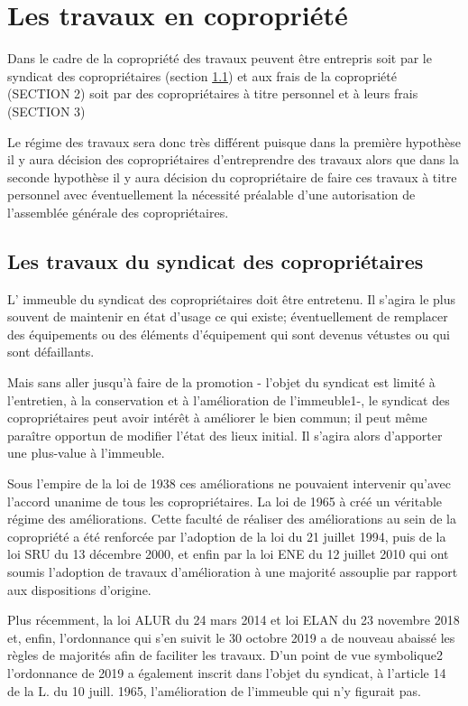 \chapter{Les travaux en copropriété}

Dans le cadre de la copropriété des travaux peuvent être entrepris soit par le syndicat des copropriétaires (section \ref{21_I}) et aux frais de la copropriété (SECTION 2) soit par des copropriétaires à titre personnel et à leurs frais (SECTION 3)

Le régime des travaux sera donc très différent puisque dans la première hypothèse il y aura décision des copropriétaires d'entreprendre des travaux alors que dans la seconde hypothèse il y aura décision du copropriétaire de faire ces travaux à titre personnel avec éventuellement la nécessité préalable d’une autorisation de l'assemblée générale des copropriétaires.

\section{Les travaux du syndicat des copropriétaires}\label{21_I}
	
	L' immeuble du syndicat des copropriétaires doit être entretenu. Il s'agira le plus souvent de maintenir en état d’usage ce qui existe; éventuellement de remplacer des équipements ou des éléments d’équipement qui sont devenus vétustes ou qui sont défaillants.
	
	Mais sans aller jusqu’à faire de la promotion - l’objet du syndicat est limité à l'entretien, à la conservation et à l’amélioration de l'immeuble1-, le syndicat des copropriétaires peut avoir intérêt à améliorer le bien commun; il peut même paraître opportun de modifier l'état des lieux initial. Il s'agira alors d'apporter une plus-value à l’immeuble.
	
	Sous l'empire de la loi de 1938 ces améliorations ne pouvaient intervenir qu'avec l'accord unanime de tous les copropriétaires. La loi de 1965 à créé un véritable régime des améliorations. Cette faculté de réaliser des améliorations au sein de la copropriété a été renforcée par l'adoption de la loi du 21 juillet 1994, puis de la loi SRU du 13 décembre 2000, et enfin par la loi ENE du 12 juillet 2010 qui ont soumis l'adoption de travaux d'amélioration à une majorité assouplie par rapport aux dispositions d'origine.
	
	Plus récemment, la loi ALUR du 24 mars 2014 et loi ELAN du 23 novembre 2018 et, enfin, l’ordonnance qui s’en suivit le 30 octobre 2019 a de nouveau abaissé les règles de majorités afin de faciliter les travaux. D’un point de vue symbolique2 l’ordonnance de 2019 a également inscrit dans l’objet du syndicat, à l’article 14 de la L. du 10 juill. 1965, l’amélioration de l’immeuble qui n’y figurait pas.
	
